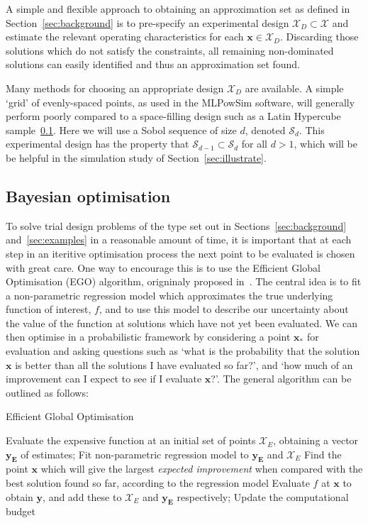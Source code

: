 \documentclass{article} %
\begin{document}
A simple and flexible approach to obtaining an approximation set as defined in Section~\ref{sec:background} is to pre-specify an experimental design $\mathcal{X}_{D} \subset \mathcal{X}$ and estimate the relevant operating characteristics for each $\mathbf{x} \in \mathcal{X}_{D}$. Discarding those solutions which do not satisfy the constraints, all remaining non-dominated solutions can easily identified and thus an approximation set found.

Many methods for choosing an appropriate design $\mathcal{X}_{D}$ are available. A simple `grid' of evenly-spaced points, as used in the MLPowSim software, will generally perform poorly compared to a space-filling design such as a Latin Hypercube sample~\ref{}. Here we will use a Sobol sequence of size $d$, denoted $\mathcal{S}_{d}$. This experimental design has the property that $\mathcal{S}_{d-1} \subset \mathcal{S}_{d}$ for all $d > 1$, which will be be helpful in the simulation study of Section~\ref{sec:illustrate}.

\subsection{Bayesian optimisation}

To solve trial design problems of the type set out in Sections~\ref{sec:background} and~\ref{sec:examples} in a reasonable amount of time, it is important that at each step in an iteritive optimisation process the next point to be evaluated is chosen with great care. One way to encourage this is to use the Efficient Global Optimisation (EGO) algorithm, origninaly proposed in~\cite{Jones1998}. The central idea is to fit a non-parametric regression model which approximates the true underlying function of interest, $f$, and to use this model to describe our uncertainty about the value of the function at solutions which have not yet been evaluated. We can then optimise in a probabilistic framework by considering a point $\textbf{x}_{*}$ for evaluation and asking questions such as `what is the probability that the solution $\textbf{x}$ is better than all the solutions I have evaluated so far?', and `how much of an improvement can I expect to see if I evaluate $\textbf{x}$?'. The general algorithm can be outlined as follows:

\begin{algorithm}
\caption{Efficient Global Optimisation}\label{alg:EGO}
\begin{algorithmic}[1]
\State Evaluate the expensive function at an initial set of points $\mathcal{X}_{E}$, obtaining a vector $\mathbf{y_{E}}$ of estimates;
\State Fit non-parametric regression model to $\mathbf{y_{E}}$ and $\mathcal{X}_{E}$
\State Find the point $\mathbf{x}$ which will give the largest \emph{expected improvement} when compared with the best solution found so far, according to the regression model
\State Evaluate $f$ at $\mathbf{x}$ to obtain $\mathbf{y}$, and add these to $\mathcal{X}_{E}$ and $\mathbf{y_{E}}$ respectively;
\State Update the computational budget
\EndWhile
\end{algorithmic}
\end{algorithm}
\end{document}
